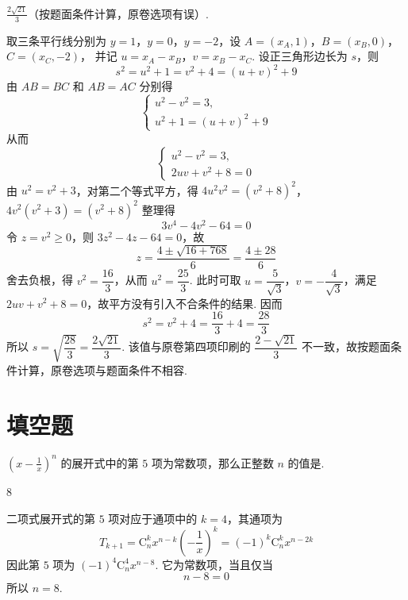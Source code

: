 \begin{answer}
\(\frac{2\sqrt{21}}{3}\)（按题面条件计算，原卷选项有误）.
\end{answer}

\begin{solution}
取三条平行线分别为 \(y=1\)，\(y=0\)，\(y=-2\)，设 \(A=(x_{A},1)\)，\(B=(x_{B},0)\)，\(C=(x_{C},-2)\)，
并记 \(u=x_{A}-x_{B}\)，\(v=x_{B}-x_{C}\). 设正三角形边长为 \(s\)，则
\[
s^{2}=u^{2}+1=v^{2}+4=(u+v)^{2}+9
\]
由 \(AB=BC\) 和 \(AB=AC\) 分别得
\[
\begin{cases}
u^{2}-v^{2}=3,\\
u^{2}+1=(u+v)^{2}+9
\end{cases}
\]
从而
\[
\begin{cases}
u^{2}-v^{2}=3,\\
2uv+v^{2}+8=0
\end{cases}
\]
由 \(u^{2}=v^{2}+3\)，对第二个等式平方，得
\(4u^{2}v^{2}=(v^{2}+8)^{2}\)，\(4v^{2}(v^{2}+3)=(v^{2}+8)^{2}\)
整理得
\[
3v^{4}-4v^{2}-64=0
\]
令 \(z=v^{2}\geqslant0\)，则 \(3z^{2}-4z-64=0\)，故
\[
z=\frac{4\pm\sqrt{16+768}}{6}=\frac{4\pm28}{6}
\]
舍去负根，得 \(v^{2}=\dfrac{16}{3}\)，从而 \(u^{2}=\dfrac{25}{3}\). 此时可取 \(u=\dfrac5{\sqrt3}\)，\(v=-\dfrac4{\sqrt3}\)，满足 \(2uv+v^{2}+8=0\)，故平方没有引入不合条件的结果. 因而
\[
s^{2}=v^{2}+4=\frac{16}{3}+4=\frac{28}{3}
\]
所以 \(s=\sqrt{\dfrac{28}{3}}=\dfrac{2\sqrt{21}}{3}\). 该值与原卷第四项印刷的 \(\dfrac{2-\sqrt{21}}{3}\) 不一致，故按题面条件计算，原卷选项与题面条件不相容.
\end{solution}

\section{填空题}
\begin{problem}
\(\left(x - \frac{1}{x}\right)^n\) 的展开式中的第 \(5\) 项为常数项，那么正整数 \(n\) 的值是\fillinblank{}.
\end{problem}

\begin{answer}
\(8\)
\end{answer}

\begin{solution}
二项式展开式的第 \(5\) 项对应于通项中的 \(k=4\)，其通项为
\[
T_{k+1}=\mathrm C_n^k x^{n-k}\left(-\frac{1}{x}\right)^k=(-1)^k\mathrm C_n^k x^{n-2k}
\]
因此第 \(5\) 项为 \((-1)^4\mathrm C_n^4x^{n-8}\). 它为常数项，当且仅当
\[
n-8=0
\]
所以 \(n=8\).
\end{solution}

